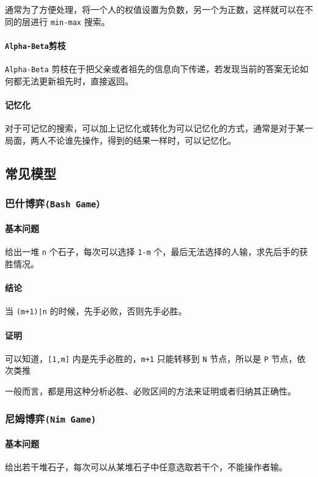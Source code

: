 \documentclass[UTF-8]{ctexart}
\begin{document}
	通常为了方便处理，将一个人的权值设置为负数，另一个为正数，这样就可以在不同的层进行 \texttt{min-max} 搜索。
	
	\paragraph{\texttt{Alpha-Beta}剪枝} \texttt{Alpha-Beta} 剪枝在于把父亲或者祖先的信息向下传递，若发现当前的答案无论如何都无法更新祖先时，直接返回。
	\paragraph{记忆化}对于可记忆的搜索，可以加上记忆化或转化为可以记忆化的方式，通常是对于某一局面，两人不论谁先操作，得到的结果一样时，可以记忆化。
	\subsection{常见模型}
	
	\subsubsection{巴什博弈\texttt{(Bash Game）}}
	\paragraph{基本问题} 给出一堆 \texttt{n} 个石子，每次可以选择 \texttt{1-m} 个，最后无法选择的人输，求先后手的获胜情况。
	\paragraph{结论} 当 \texttt{(m+1)|n} 的时候，先手必败，否则先手必胜。
	\paragraph{证明} 可以知道，\texttt{[1,m]} 内是先手必胜的，\texttt{m+1} 只能转移到 \texttt{N} 节点，所以是 \texttt{P} 节点，依次类推
	
	一般而言，都是用这种分析必胜、必败区间的方法来证明或者归纳其正确性。
	
	\subsubsection{尼姆博弈\texttt{(Nim Game)}}
	\paragraph{基本问题} 给出若干堆石子，每次可以从某堆石子中任意选取若干个，不能操作者输。
\end{document}
